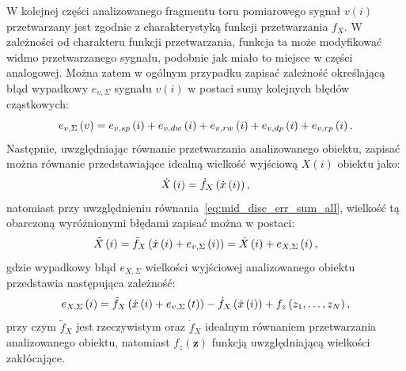 W kolejnej części analizowanego fragmentu toru pomiarowego sygnał $v(i)$ przetwarzany jest zgodnie z charakterystyką funkcji przetwarzania $f_{X}$. W zależności od charakteru funkcji przetwarzania, funkcja ta może modyfikować widmo przetwarzanego sygnału, podobnie jak miało to miejsce w części analogowej. Można zatem w ogólnym przypadku zapisać zależność określającą błąd wypadkowy $e_{v,\Sigma}$ sygnału $v(i)$ w postaci sumy kolejnych błędów cząstkowych:
\begin{equation}
e_{v,\Sigma} \left(v\right) = e_{v,sp} \left(i\right) + e_{v,dw} \left(i\right) + e_{v,rw} \left(i\right) + e_{v,dp} \left(i\right) + e_{v,rp} \left(i\right) \label{eq:mid_disc_err_sum_all}.
\end{equation}
Następnie, uwzględniając równanie przetwarzania analizowanego obiektu, zapisać można równanie przedstawiające idealną wielkość wyjściową $X(i)$ obiektu jako:
\begin{equation}
\dot{X} \left(i\right) = \dot{f}_{X} \left( \dot{x} \left(i\right) \right) \label{eq:out_disc_ideal_all},
\end{equation}
natomiast przy uwzględnieniu równania~\eqref{eq:mid_disc_err_sum_all}, wielkość tą obarczoną wyróżnionymi błędami zapisać można w postaci:
\begin{equation}
\tilde{X} \left(i\right) = \tilde{f}_{X} \left( \dot{x} \left(i\right) + e_{v,\Sigma} \left(i\right) \right) = \dot{X} \left(i\right) + e_{X,\Sigma} \left(i\right) \label{eq:out_disc_real_all},
\end{equation}
gdzie wypadkowy błąd $e_{X,\Sigma}$ wielkości wyjściowej analizowanego obiektu przedstawia następująca zależność:
\begin{equation}
e_{X,\Sigma} \left(i\right) = \tilde{f}_{X} \left( \dot{x} \left(i\right) + e_{v,\Sigma} \left(t\right) \right) - \dot{f}_{X} \left( \dot{x} \left(i\right) \right) + f_{z} \left( z_{1}, \hdots, z_{N} \right) \label{eq:out_disc_err_sum_all},
\end{equation}
przy czym $\tilde{f}_{X}$ jest rzeczywistym oraz $\dot{f}_{X}$ idealnym równaniem przetwarzania analizowanego obiektu, natomiast $f_{z}(\mathbf{z})$ funkcją uwzględniającą wielkości zakłócające.

